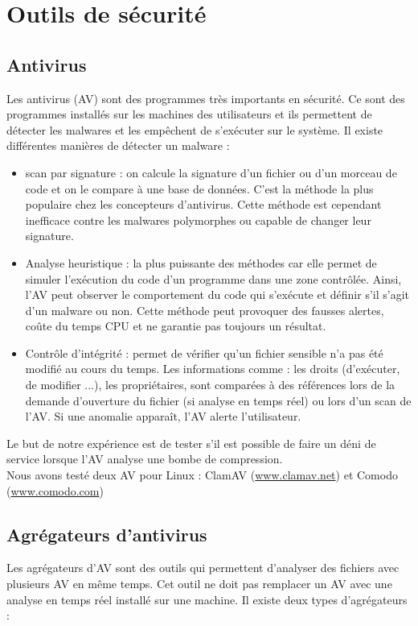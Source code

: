 \documentclass[smallextended]{svjour3}       %
\begin{document}
\section{Outils de sécurité}
\label{2.Outils}

\subsection{Antivirus}
\label{2.1antivirus}
Les antivirus (AV) sont des programmes très importants en sécurité. Ce sont des programmes installés sur les machines des utilisateurs et ils permettent de détecter les malwares et les empêchent de s’exécuter sur le système. Il existe différentes manières de détecter un malware : 
\begin{itemize}
\item scan par signature : on calcule la signature d'un fichier ou d'un morceau de code et on le compare à une base de données. C'est la méthode la plus populaire chez les concepteurs d'antivirus. Cette méthode est cependant inefficace contre les malwares polymorphes ou capable de changer leur signature.
\item Analyse heuristique : la plus puissante des méthodes car elle permet de simuler l’exécution du code d'un programme dans une zone contrôlée. Ainsi, l'AV peut observer le comportement du code qui s’exécute et définir s'il s'agit d'un malware ou non. Cette méthode peut provoquer des fausses alertes, coûte du temps CPU et ne garantie pas toujours un résultat.
\item Contrôle d'intégrité : permet de vérifier qu'un fichier sensible n'a pas été modifié au cours du temps. Les informations comme : les droits (d'exécuter, de modifier ...), les propriétaires, sont comparées à des références lors de la demande d'ouverture du fichier (si analyse en temps réel) ou lors d'un scan de l'AV. Si une anomalie apparaît, l'AV alerte l'utilisateur.\\
\end{itemize}
Le but de notre expérience est de tester s'il est possible de faire un déni de service lorsque l'AV analyse une bombe de compression.\\
Nous avons testé deux AV pour Linux : ClamAV (\url{www.clamav.net}) et Comodo (\url{www.comodo.com})\\

\subsection{Agrégateurs d'antivirus}
\label{2.2agrégateurs}
Les agrégateurs d'AV sont des outils qui permettent d'analyser des fichiers avec plusieurs AV en même temps. Cet outil ne doit pas remplacer un AV avec une analyse en temps réel installé sur une machine. Il existe deux types d’agrégateurs :  
\end{document}
